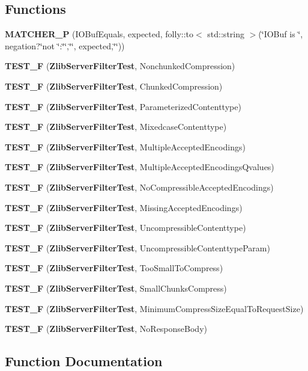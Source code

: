 \subsection*{Functions}
\begin{DoxyCompactItemize}
\item 
{\bf M\+A\+T\+C\+H\+E\+R\+\_\+P} (I\+O\+Buf\+Equals, expected, folly\+::to$<$ std\+::string $>$(\char`\"{}I\+O\+Buf is \char`\"{}, negation?\char`\"{}not \char`\"{}\+:\char`\"{}\char`\"{},\char`\"{}\textquotesingle{}\char`\"{}, expected,\char`\"{}\textquotesingle{}\char`\"{}))
\item 
{\bf T\+E\+S\+T\+\_\+F} ({\bf Zlib\+Server\+Filter\+Test}, Nonchunked\+Compression)
\item 
{\bf T\+E\+S\+T\+\_\+F} ({\bf Zlib\+Server\+Filter\+Test}, Chunked\+Compression)
\item 
{\bf T\+E\+S\+T\+\_\+F} ({\bf Zlib\+Server\+Filter\+Test}, Parameterized\+Contenttype)
\item 
{\bf T\+E\+S\+T\+\_\+F} ({\bf Zlib\+Server\+Filter\+Test}, Mixedcase\+Contenttype)
\item 
{\bf T\+E\+S\+T\+\_\+F} ({\bf Zlib\+Server\+Filter\+Test}, Multiple\+Accepted\+Encodings)
\item 
{\bf T\+E\+S\+T\+\_\+F} ({\bf Zlib\+Server\+Filter\+Test}, Multiple\+Accepted\+Encodings\+Qvalues)
\item 
{\bf T\+E\+S\+T\+\_\+F} ({\bf Zlib\+Server\+Filter\+Test}, No\+Compressible\+Accepted\+Encodings)
\item 
{\bf T\+E\+S\+T\+\_\+F} ({\bf Zlib\+Server\+Filter\+Test}, Missing\+Accepted\+Encodings)
\item 
{\bf T\+E\+S\+T\+\_\+F} ({\bf Zlib\+Server\+Filter\+Test}, Uncompressible\+Contenttype)
\item 
{\bf T\+E\+S\+T\+\_\+F} ({\bf Zlib\+Server\+Filter\+Test}, Uncompressible\+Contenttype\+Param)
\item 
{\bf T\+E\+S\+T\+\_\+F} ({\bf Zlib\+Server\+Filter\+Test}, Too\+Small\+To\+Compress)
\item 
{\bf T\+E\+S\+T\+\_\+F} ({\bf Zlib\+Server\+Filter\+Test}, Small\+Chunks\+Compress)
\item 
{\bf T\+E\+S\+T\+\_\+F} ({\bf Zlib\+Server\+Filter\+Test}, Minimum\+Compress\+Size\+Equal\+To\+Request\+Size)
\item 
{\bf T\+E\+S\+T\+\_\+F} ({\bf Zlib\+Server\+Filter\+Test}, No\+Response\+Body)
\end{DoxyCompactItemize}


\subsection{Function Documentation}
